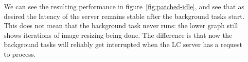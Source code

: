 We can see the resulting performance in figure~\ref{fig:patched-idle}, and see
that as desired the latency of the server remains stable after the background
tasks start. This does not mean that the background task never runs: the lower
graph still shows iterations of image resizing being done. The difference is
that now the background tasks will reliably get interrupted when the LC server
has a request to process.
